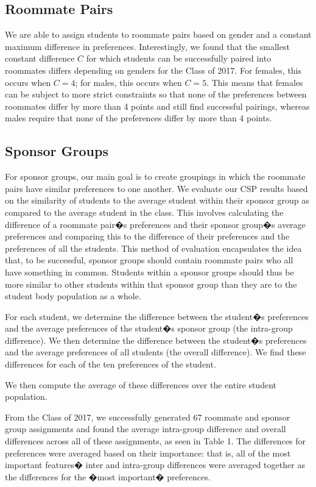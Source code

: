 \documentclass[letterpaper]{article}
\begin{document}
\subsection{Roommate Pairs}

We are able to assign students to roommate pairs based on gender and a constant maximum difference in preferences. Interestingly, we found that the smallest constant difference $C$ for which students can be successfully paired into roommates differs depending on genders for the Class of 2017. For females, this occurs when $C = 4$; for males, this occurs when $C = 5$. This means that females can be subject to more strict constraints so that none of the preferences between roommates differ by more than 4 points and still find successful pairings, whereas males require that none of the preferences differ by more than 4 points.


\subsection{Sponsor Groups}

For sponsor groups, our main goal is to create groupings in which the roommate pairs have similar preferences to one another. We evaluate our CSP results based on the similarity of students to the average student within their sponsor group as compared to the average student in the class. This involves calculating the difference of a roommate pair�s preferences and their sponsor group�s average preferences and comparing this to the difference of their preferences and the preferences of all the students. This method of evaluation encapsulates the idea that, to be successful, sponsor groups should contain roommate pairs who all have something in common. Students within a sponsor groups should thus be more similar to other students within that sponsor group than they are to the student body population as a whole.

For each student, we determine the difference between the student�s preferences and the average preferences of the student�s sponsor group (the intra-group difference). We then determine the difference between the student�s preferences and the average preferences of all students (the overall difference). We find these differences for each of the ten preferences of the student.

We then compute the average of these differences over the entire student population.

From the Class of 2017, we successfully generated 67 roommate and sponsor group assignments and found the average intra-group difference and overall differences across all of these assignments, as seen in Table 1. The differences for preferences were averaged based on their importance: that is, all of the most important features� inter and intra-group differences were averaged together as the differences for the �most important� preferences. \\
\end{document}

